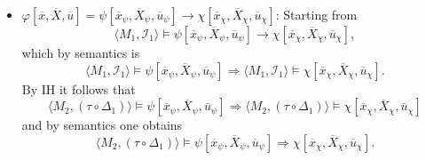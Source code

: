 \documentclass[11pt,a4paper]{article}
\newcommand{\sto}{\Rightarrow}
\begin{document}
\begin{itemize}[leftmargin=*]
\item  $\varphi[\overline{x}, \overline{X}, \overline{u}] = \psi[\overline{x}_{\psi}, \overline{X}_{\psi}, \overline{u}_{\psi}] \to \chi[\overline{x}_{\chi}, \overline{X}_{\chi}, \overline{u}_{\chi}]$: 
Starting from 
\begin{equation*}
\langle M_1, \mathcal{I}_1 \rangle \models \psi[\overline{x}_{\psi}, \overline{X}_{\psi}, \overline{u}_{\psi}] \to \chi[\overline{x}_{\chi}, \overline{X}_{\chi}, \overline{u}_{\chi}],
\end{equation*}
which by semantics is 
\begin{equation*}
\langle M_1, \mathcal{I}_1 \rangle \models \psi[\overline{x}_{\psi}, \overline{X}_{\psi}, \overline{u}_{\psi}] \sto \langle M_1, \mathcal{I}_1 \rangle \models \chi[\overline{x}_{\chi}, \overline{X}_{\chi}, \overline{u}_{\chi}].
\end{equation*}
By IH it follows that  
\begin{equation*}
\langle M_2, (\tau \circ \Delta_1) \rangle \models \psi[\overline{x}_{\psi}, \overline{X}_{\psi}, \overline{u}_{\psi}] \sto\langle M_2, (\tau \circ \Delta_1) \rangle \models \chi[\overline{x}_{\chi}, \overline{X}_{\chi}, \overline{u}_{\chi}]
\end{equation*}
and by semantics one obtains 
\begin{equation*}
\langle M_2, (\tau \circ \Delta_1) \rangle \models \psi[\overline{x}_{\psi}, \overline{X}_{\psi}, \overline{u}_{\psi}] \sto \chi[\overline{x}_{\chi}, \overline{X}_{\chi}, \overline{u}_{\chi}].
\end{equation*}\\



\end{itemize}
\end{document}
